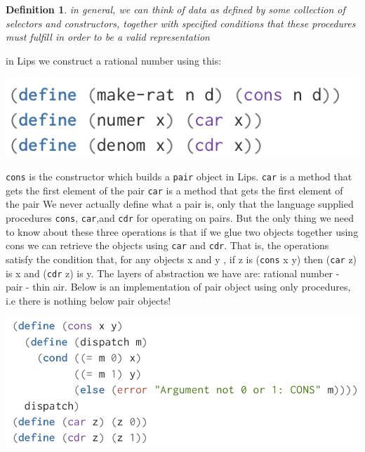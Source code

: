 \documentclass[a4paper,twoside]{article}
\newtheorem{definition}[theorem]{Definition}
\numberwithin{equation}{section}
\begin{document}
\begin{definition}
    in general, we can think of data as defined by some collection of selectors and constructors, together with specified conditions that these
    procedures must fulfill in order to be a valid representation
\end{definition}
in Lips we construct a rational number using this:
\begin{center}
    \includegraphics[scale = 0.3]{assets/rational_number_constr.png}
\end{center}
\texttt{cons} is the constructor which builds a \texttt{pair} object in Lips. \newline
\texttt{car} is a method that gets the first element of the pair\newline
\texttt{car} is a method that gets the first element of the pair\newline
We never actually define what a pair is, only that the language
supplied procedures \texttt{cons}, \texttt{car},and \texttt{cdr} for operating on pairs.
But the only thing we need to know about these three operations is that if we glue two objects
together using cons we can retrieve the objects using \texttt{car} and \texttt{cdr}.
That is, the operations satisfy the condition that, for any objects x and y , if z is (\texttt{cons} x y)
then (\texttt{car} z) is x and (\texttt{cdr} z) is y. \newline
The layers of abstraction we have are: rational number - pair - thin air.
Below is an implementation of pair object using only procedures, i.e there is nothing below pair objects!
\begin{center}
    \includegraphics[scale = 0.3]{assets/thin-air.png}
\end{center}
\end{document}
